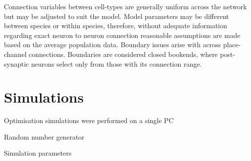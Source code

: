 Connection variables between cell-types are generally uniform across the network but may be adjusted to suit the model.
Model parameters may be different between species or within species, therefore, without adequate information regarding exact neuron to neuron connection reasonable assumptions are made based on the average population data.
Boundary issues arise with across place-channel connections.
Boundaries are considered closed bookends, where post-synaptic neurons select only from those with its connection range.


\section{Simulations}

Optimisation simulations were performed on a single PC 


Random number generator 



Simulation parameters



